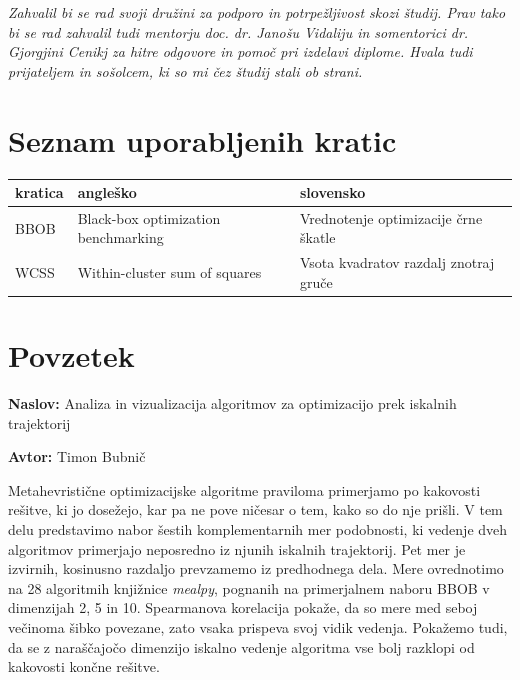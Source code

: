 \documentclass[a4paper, 12pt]{book}
\newcommand{\ttitle}{Analiza in vizualizacija algoritmov za optimizacijo prek iskalnih trajektorij}
\newcommand{\tauthor}{Timon Bubnič}
\newcommand{\clearemptydoublepage}{\newpage{\pagestyle{empty}\cleardoublepage}}
\begin{document}
\vspace{15mm}
\vspace{2cm}
\clearemptydoublepage

\thispagestyle{empty}\mbox{}\vfill\null\it%
\noindent
Zahvalil bi se rad svoji družini za podporo in potrpežljivost skozi študij. Prav tako bi se rad zahvalil tudi mentorju doc. dr. Janošu Vidaliju in somentorici dr. Gjorgjini Cenikj za hitre odgovore in pomoč pri izdelavi diplome. Hvala tudi prijateljem in sošolcem, ki so mi čez študij stali ob strani. 

\rm\normalfont
\clearemptydoublepage

\pagestyle{empty}
\def\thepage{}%
\tableofcontents{}
\clearemptydoublepage

\chapter*{Seznam uporabljenih kratic}

\noindent\begin{tabular}{p{}|p{}|p{}}
  {\bf kratica} & {\bf angleško}                        & {\bf slovensko} \\ \hline
  {BBOB} & {Black-box optimization benchmarking} & {Vrednotenje optimizacije črne škatle} \\ \hline
  {WCSS} & {Within-cluster sum of squares}       & {Vsota kvadratov razdalj znotraj gruče}
\end{tabular}
\clearemptydoublepage

\chapter*{Povzetek}

\noindent\textbf{Naslov:} \ttitle
\bigskip

\noindent\textbf{Avtor:} \tauthor
\bigskip

\noindent
Metahevristične optimizacijske algoritme praviloma primerjamo po kakovosti
rešitve, ki jo dosežejo, kar pa ne pove ničesar o tem, kako so do nje prišli.
V tem delu predstavimo nabor šestih komplementarnih mer podobnosti, ki
vedenje dveh algoritmov primerjajo neposredno iz njunih iskalnih trajektorij.
Pet mer je izvirnih, kosinusno razdaljo prevzamemo iz predhodnega dela. Mere
ovrednotimo na 28 algoritmih knjižnice \emph{mealpy}, pognanih na primerjalnem
naboru BBOB v dimenzijah 2, 5 in 10. Spearmanova korelacija pokaže, da so
mere med seboj večinoma šibko povezane, zato vsaka prispeva svoj vidik
vedenja. Pokažemo tudi, da se z naraščajočo dimenzijo iskalno vedenje
algoritma vse bolj razklopi od kakovosti končne rešitve.
\end{document}
